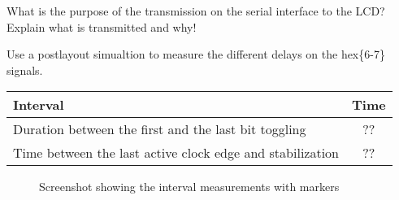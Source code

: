 \documentclass[10pt,a4paper,titlepage,oneside]{article}
\begin{document}
\begin{qa}{What is the purpose of the transmission on the serial interface to the LCD? Explain what is transmitted and why!}

\end{qa}

\begin{qa}{Use a postlayout simualtion to measure the different delays on the \textsf{hex\{6-7\}} signals.}

\begin{center}
\begin{tabular}{lc}
	\hline
	Interval                                                  & Time \\ \hline\hline
	Duration between the first and the last bit toggling      &  ?? \\
	Time between the last active clock edge and stabilization &  ?? \\\hline
\end{tabular}
\end{center}

\begin{figure}[h!]
	\centering
	\dummyimage
	\caption{Screenshot showing the interval measurements with markers}
\end{figure}

\end{qa}



\end{document}
